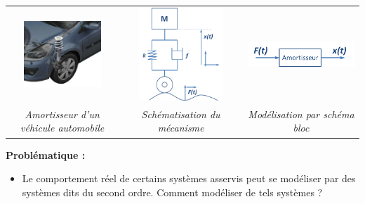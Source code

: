 \documentclass[10pt]{article}
\begin{document}









\begin{center}
\begin{tabular}{ccccc}
\includegraphics[height=2.5cm]{png/amort1} &&
\includegraphics[height=3.5cm]{png/schema} && 
\includegraphics[height=1.5cm]{png/bloc}\\
\textit{Amortisseur d'un véhicule automobile} &&
\textit{Schématisation du mécanisme} &&
\textit{Modélisation par schéma bloc}\\
\end{tabular}
\end{center}


\vspace{.2cm}


\begin{obj}
\textbf{Problématique :}
\begin{itemize}
\item Le comportement réel de certains systèmes asservis peut se modéliser par des systèmes dits du second ordre. Comment modéliser de tels systèmes ?
\end{itemize}
\end{obj}
\end{document}
